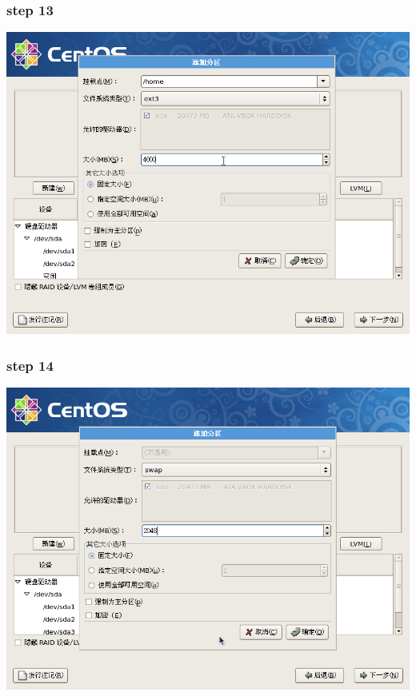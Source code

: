 \documentclass[xcolor=svgnames,presentation]{beamer}
\begin{document}
\begin{frame}
\frametitle{step 13}
\label{sec-2-13}

\begin{center}
\includegraphics[width=.9\linewidth]{img/img20.png}
\end{center}
\end{frame}
\begin{frame}
\frametitle{step 14}
\label{sec-2-14}

\begin{center}
\includegraphics[width=.9\linewidth]{img/img22.png}
\end{center}
\end{frame}
\end{document}
